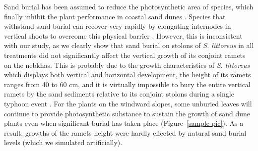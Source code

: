 \documentclass[]{interact}
\theoremstyle{plain}%
\theoremstyle{definition}
\theoremstyle{remark}
\begin{document}
Sand burial has been assumed to reduce the photosynthetic area of species, which finally inhibit the plant performance in coastal sand dunes \citep{hespEcologicalProcessesPlant1991,brownMechanismsSurvivingBurial2018}. 
Species that withstand sand burial can recover very rapidly by elongating internodes in vertical shoots to overcome this physical barrier \citep{frosiniGlobalChangeResponse2012,keijsersModelingBiogeomorphicEvolution2016,quEffectsSandBurial2017,enriquezAssessingBeachDune2019}. 
However, this is inconsistent with our study, as we clearly show that sand burial on stolons of \textit{S. littoreus} in all treatments did not significantly affect the vertical growth of its conjoint ramets on the nebkhas. This is probably due to the growth characteristics of \textit{S. littoreus} which displays both vertical and horizontal development, the height of its ramets ranges from 40 to 60 cm, and it is virtually impossible to bury the entire vertical ramets by the sand sediments relative to its conjoint stolons during a single typhoon event \citep{xian-jiDiurnalVariationCharacteristics2017}. For the plants on the windward slopes, some unburied leaves will continue to provide photosynthetic substance to sustain the growth of sand dune plants even when significant burial has taken place (Figure~\ref{sample-pic}). As a result, growths of the ramets height were hardly effected by natural sand burial levels (which we simulated artificially).
\end{document}
